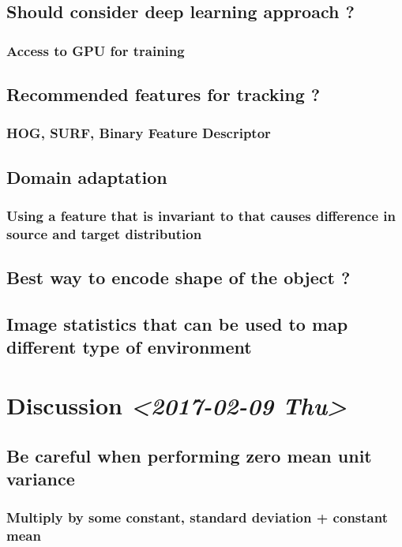 \documentclass[11pt]{article}
\begin{document}
\subsection{Should consider deep learning approach ?}
\label{sec:org023f09a}
\subsubsection{Access to GPU for training}
\label{sec:orgb1722c8}
\subsection{Recommended features for tracking ?}
\label{sec:orgf593b5d}
\subsubsection{HOG, SURF, Binary Feature Descriptor}
\label{sec:org3849751}
\subsection{Domain adaptation}
\label{sec:orgaf1f0fb}
\subsubsection{Using a feature that is invariant to that causes difference in source and target distribution}
\label{sec:orgf533557}
\subsection{Best way to encode shape of the object ?}
\label{sec:org50aea90}
\subsection{Image statistics that can be used to map different type of environment}
\label{sec:org14ff2d3}
\section{Discussion \textit{<2017-02-09 Thu>}}
\label{sec:org5eb5c06}
\subsection{Be careful when performing zero mean unit variance}
\label{sec:orga6edece}
\subsubsection{Multiply by some constant, standard deviation + constant mean}
\label{sec:org4a65b5b}
\end{document}
